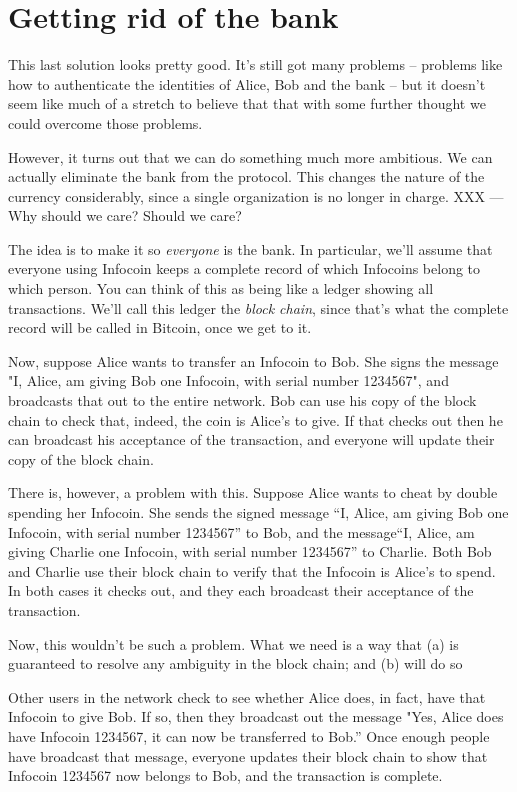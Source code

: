 \documentclass[12pt]{book}
\newcounter{problem}[chapter]
\begin{document}
\section{Getting rid of the bank}

This last solution looks pretty good.  It's still got many problems --
problems like how to authenticate the identities of Alice, Bob and the
bank -- but it doesn't seem like much of a stretch to believe that
that with some further thought we could overcome those problems.

However, it turns out that we can do something much more ambitious.
We can actually eliminate the bank from the protocol.  This changes
the nature of the currency considerably, since a single organization
is no longer in charge.  XXX --- Why should we care?  Should we care?

The idea is to make it so \emph{everyone} is the bank.  In particular,
we'll assume that everyone using Infocoin keeps a complete record of
which Infocoins belong to which person.  You can think of this as
being like a ledger showing all transactions.  We'll call this ledger
the \emph{block chain}, since that's what the complete record will be
called in Bitcoin, once we get to it.

Now, suppose Alice wants to transfer an Infocoin to Bob.  She signs
the message "I, Alice, am giving Bob one Infocoin, with serial number
1234567", and broadcasts that out to the entire network.  Bob can use
his copy of the block chain to check that, indeed, the coin is Alice's
to give.  If that checks out then he can broadcast his acceptance of
the transaction, and everyone will update their copy of the block
chain.

There is, however, a problem with this.  Suppose Alice wants to cheat
by double spending her Infocoin.  She sends the signed message ``I,
Alice, am giving Bob one Infocoin, with serial number 1234567'' to
Bob, and the message``I, Alice, am giving Charlie one Infocoin, with
serial number 1234567'' to Charlie.  Both Bob and Charlie use their
block chain to verify that the Infocoin is Alice's to spend.  In both
cases it checks out, and they each broadcast their acceptance of the
transaction.

Now, this wouldn't be such a problem.  What we need is a way that (a)
is guaranteed to resolve any ambiguity in the block chain; and (b)
will do so

Other users
in the network check to see whether Alice does, in fact, have that
Infocoin to give Bob.  If so, then they broadcast out the message
"Yes, Alice does have Infocoin 1234567, it can now be transferred to
Bob.''  Once enough people have broadcast that message, everyone
updates their block chain to show that Infocoin 1234567 now belongs to
Bob, and the transaction is complete.
\end{document}
